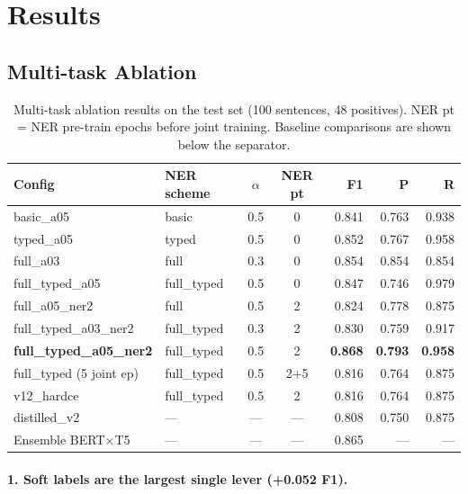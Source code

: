 \documentclass[12pt,a4paper]{article}
\begin{document}
\section{Results}
\label{sec:results}

\subsection{Multi-task Ablation}

\begin{table}[H]
\centering
\small
\caption{Multi-task ablation results on the test set (100 sentences, 48 positives).
NER pt = NER pre-train epochs before joint training.
Baseline comparisons are shown below the separator.}
\label{tab:ablation}
\begin{tabular}{llccrrr}
\toprule
\textbf{Config} & \textbf{NER scheme} & $\alpha$ & \textbf{NER pt} &
\textbf{F1} & \textbf{P} & \textbf{R} \\
\midrule
basic\_a05           & basic       & 0.5 & 0 & 0.841 & 0.763 & 0.938 \\
typed\_a05           & typed       & 0.5 & 0 & 0.852 & 0.767 & 0.958 \\
full\_a03            & full        & 0.3 & 0 & 0.854 & 0.854 & 0.854 \\
full\_typed\_a05     & full\_typed & 0.5 & 0 & 0.847 & 0.746 & 0.979 \\
full\_a05\_ner2      & full        & 0.5 & 2 & 0.824 & 0.778 & 0.875 \\
full\_typed\_a03\_ner2 & full\_typed & 0.3 & 2 & 0.830 & 0.759 & 0.917 \\
\rowcolor{bestrow}
\textbf{full\_typed\_a05\_ner2} & full\_typed & 0.5 & 2 & \textbf{0.868} & \textbf{0.793} & \textbf{0.958} \\
full\_typed (5 joint ep) & full\_typed & 0.5 & 2+5 & 0.816 & 0.764 & 0.875 \\
\midrule
\rowcolor{greyrow}
v12\_hardce          & full\_typed & 0.5 & 2 & 0.816 & 0.764 & 0.875 \\
\rowcolor{greyrow}
distilled\_v2        & ---         & --- & --- & 0.808 & 0.750 & 0.875 \\
\rowcolor{greyrow}
Ensemble BERT$\times$T5 & ---      & --- & --- & 0.865 & ---   & ---   \\
\bottomrule
\end{tabular}
\end{table}

\paragraph{1. Soft labels are the largest single lever (+0.052 F1).}
\end{document}
